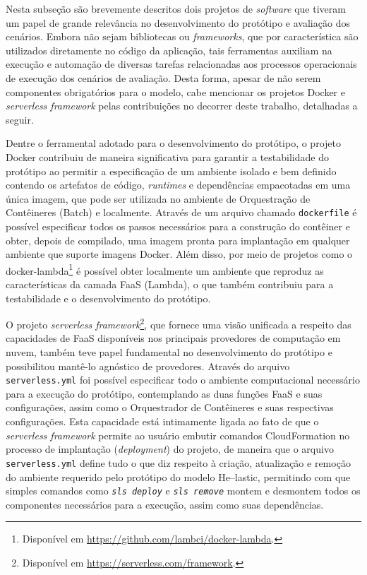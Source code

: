 \documentclass[english,brazilian]{UNISINOSmonografia} %
\begin{document}
Nesta subseção são brevemente descritos dois projetos de \textit{software} que tiveram um papel de grande relevância no desenvolvimento do protótipo e avaliação dos cenários.
%
Embora não sejam bibliotecas ou \textit{frameworks}, que por característica são utilizados diretamente no código da aplicação, tais ferramentas auxiliam na execução e automação de diversas tarefas relacionadas aos processos operacionais de execução dos cenários de avaliação.
%
Desta forma, apesar de não serem componentes obrigatórios para o modelo, cabe mencionar os projetos Docker e \textit{serverless framework} pelas contribuições no decorrer deste trabalho, detalhadas a seguir.



Dentre o ferramental adotado para o desenvolvimento do protótipo, o projeto Docker contribuiu de maneira significativa para garantir a testabilidade do protótipo ao permitir a especificação de um ambiente isolado e bem definido contendo os artefatos de código, \textit{runtimes} e dependências empacotadas em uma única imagem, que pode ser utilizada no ambiente de Orquestração de Contêineres (Batch) e localmente.
%
Através de um arquivo chamado \texttt{dockerfile} é possível especificar todos os passos necessários para a construção do contêiner e obter, depois de compilado, uma imagem pronta para implantação em qualquer ambiente que suporte imagens Docker.
%
Além disso, por meio de projetos como o docker-lambda\footnote{
	Disponível em \url{https://github.com/lambci/docker-lambda}.
} é possível obter localmente um ambiente que reproduz as características da camada FaaS (Lambda), o que também contribuiu para a testabilidade e o desenvolvimento do protótipo.




O projeto \textit{serverless framework}\footnote{
	Disponível em \url{https://serverless.com/framework}.
}, que fornece uma visão unificada a respeito das capacidades de FaaS disponíveis nos principais provedores de computação em nuvem, também teve papel fundamental no desenvolvimento do protótipo e possibilitou mantê-lo agnóstico de provedores.
%
Através do arquivo \texttt{serverless.yml} foi possível especificar todo o ambiente computacional necessário para a execução do protótipo, contemplando as duas funções FaaS e suas configurações, assim como o Orquestrador de Contêineres e suas respectivas configurações.
%
Esta capacidade está intimamente ligada ao fato de que o \textit{serverless framework} permite ao usuário embutir comandos CloudFormation no processo de implantação (\textit{deployment}) do projeto, de maneira que o arquivo \texttt{serverless.yml} define tudo o que diz respeito à criação, atualização e remoção do ambiente requerido pelo protótipo do modelo \textsf{He}--lastic, permitindo com que simples comandos como \texttt{\textit{sls deploy}} e \texttt{\textit{sls remove}} montem e desmontem todos os componentes necessários para a execução, assim como suas dependências.
\end{document}
